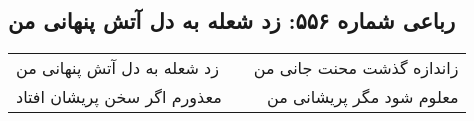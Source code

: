 \begin{center}
\section*{رباعی شماره ۵۵۶: زد شعله به دل آتش پنهانی من}
\label{sec:sh556}
\begin{longtable}{l p{0.5cm} r}
زد شعله به دل آتش پنهانی من
&&
زاندازه گذشت محنت جانی من
\\
معذورم اگر سخن پریشان افتاد
&&
معلوم شود مگر پریشانی من
\\
\end{longtable}
\end{center}

